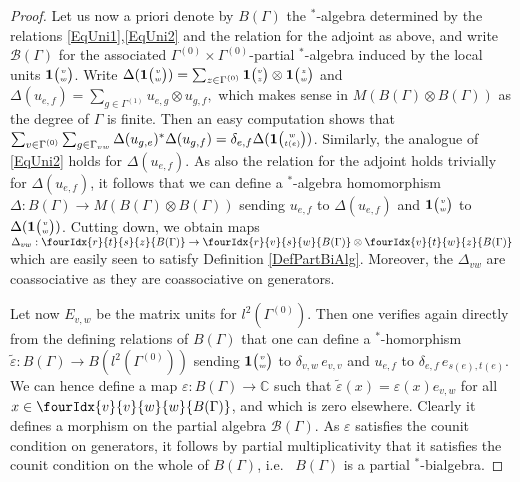 \documentclass[10pt]{article}
\newcommand{\C}{\mathbb{C}}
\newcommand{\Grt}[3]{#1{\tiny {\begin{pmatrix} #2\\#3\end{pmatrix}}}}
\newcommand{\UnitC}[2]{\Grt{\mathbf{1}}{#1}{#2}}
\newcommand{\Gr}[5]{\fourIdx{#2}{#4}{#3}{#5}{#1}}%
\theoremstyle{definition}
\numberwithin{equation}{section}
\begin{document}
\begin{proof}
Let us now a priori denote by $B(\Gamma)$ the $^*$-algebra determined by the relations \eqref{EqUni1},\eqref{EqUni2} and the relation for the adjoint as above, and write $\mathscr{B}(\Gamma)$ for the associated $\Gamma^{(0)}\times \Gamma^{(0)}$-partial $^*$-algebra induced by the local units $\UnitC{v}{w}$. Write $\Delta(\UnitC{v}{w}) = \sum_{z\in \Gamma^{(0)}} \UnitC{v}{z}\otimes \UnitC{z}{w}$ and $\Delta(u_{e,f}) = \sum_{g\in \Gamma^{(1)}} u_{e,g}\otimes u_{g,f},$ which makes sense in $M(B(\Gamma)\otimes B(\Gamma))$ as the degree of $\Gamma$ is finite. Then an easy computation shows that $ \sum_{v\in \Gamma^{(0)}}\sum_{g\in \Gamma_{vw}}\Delta(u_{g,e})^*\Delta(u_{g,f})= \delta_{e,f} \Delta(\UnitC{w}{t(e)})$. Similarly, the analogue of \eqref{EqUni2} holds for $\Delta(u_{e,f})$. As also the relation for the adjoint holds trivially for $\Delta(u_{e,f})$, it follows that we can define a $^*$-algebra homomorphism $\Delta:B(\Gamma)\rightarrow M(B(\Gamma)\otimes B(\Gamma))$ sending $u_{e,f}$ to $\Delta(u_{e,f})$ and $\UnitC{v}{w}$ to $\Delta(\UnitC{v}{w})$. Cutting down, we obtain maps $\Delta_{vw}:\Gr{B(\Gamma)}{r}{s}{t}{z}\rightarrow \Gr{B(\Gamma)}{r}{s}{v}{w}\otimes \Gr{B(\Gamma)}{v}{w}{t}{z}$ which are easily seen to satisfy Definition \ref{DefPartBiAlg}. Moreover, the $\Delta_{vw}$ are coassociative as they are coassociative on generators.

Let now $E_{v,w}$ be the matrix units for $l^2(\Gamma^{(0)})$. Then one verifies again directly from the defining relations of $B(\Gamma)$ that one can define a $^*$-homorphism $\widetilde{\varepsilon}: B(\Gamma)\rightarrow B(l^2(\Gamma^{(0)}))$ sending $\UnitC{v}{w}$ to $\delta_{v,w}\, e_{v,v}$ and $u_{e,f}$ to $\delta_{e,f}\, e_{s(e),t(e)}$. We can hence define a map $\varepsilon: B(\Gamma)\rightarrow \C$ such that $\widetilde{\varepsilon}(x) = \varepsilon(x) e_{v,w}$ for all $x\in \Gr{B(\Gamma)}{v}{w}{v}{w}$, and which is zero elsewhere. Clearly it defines a morphism on the partial algebra $\mathscr{B}(\Gamma)$. As $\varepsilon$ satisfies the counit condition on generators, it follows by partial multiplicativity that it satisfies the counit condition on the whole of $B(\Gamma)$, i.e.~ $B(\Gamma)$ is a partial $^*$-bialgebra. 


\end{proof}
\end{document}
